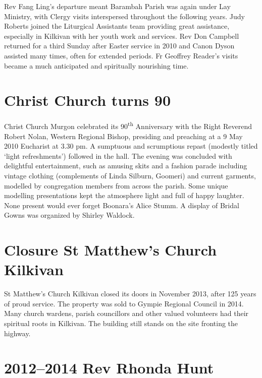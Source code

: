 Rev Fang Ling's departure meant Barambah Parish was again under Lay Ministry, with Clergy visits interspersed throughout the following years. Judy Roberts joined the Liturgical Assistants team providing great assistance, especially in Kilkivan with her youth work and services. Rev Don Campbell returned for a third Sunday after Easter service in 2010 and Canon Dyson assisted many times, often for extended periods. Fr Geoffrey Reader's visits became a much anticipated and spiritually nourishing time.



\section{Christ Church turns 90}



Christ Church Murgon celebrated its 90\textsuperscript{th} Anniversary with the Right Reverend Robert Nolan, Western Regional Bishop, presiding and preaching at a 9 May 2010 Eucharist at 3.30 pm. A sumptuous and scrumptious repast (modestly titled `light refreshments') followed in the hall. The evening was concluded with delightful entertainment, such as amusing skits and a fashion parade including vintage clothing (complements of Linda Silburn, Goomeri) and current garments, modelled by congregation members from across the parish. Some unique modelling presentations kept the atmosphere light and full of happy laughter. None present would ever forget Boonara's Alice Stumm. A display of Bridal Gowns was organized by Shirley Waldock.



\section{Closure St Matthew's Church Kilkivan}



St Matthew's Church Kilkivan closed its doors in November 2013, after 125 years of proud service. The property was sold to Gympie Regional Council in 2014. Many church wardens, parish councillors and other valued volunteers had their spiritual roots in Kilkivan. The building still stands on the site fronting the highway.



\section{2012--2014 Rev Rhonda Hunt}



